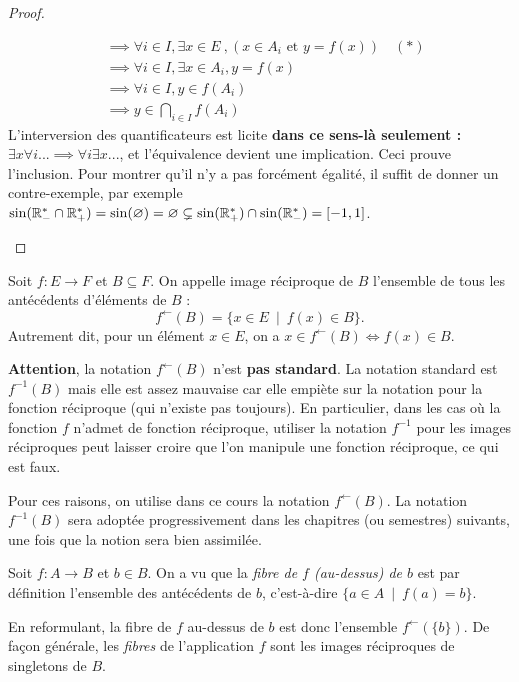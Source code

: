 \begin{proof}
\begin{enumerate}
\begin{align*}
&\boxed{\implies \forall i\in I, \exists x\in E}\:, (x\in A_i\text{ et } y=f(x)) \quad(*)\\
&\implies \forall i\in I, \exists x\in A_i, y=f(x)\\
&\implies \forall i\in I, y\in f(A_i)\\
&\implies y\in \bigcap_{i\in I} f(A_i)
\end{align*}
L'interversion des quantificateurs  est licite \textbf{dans ce sens-là seulement : $\exists x \forall i ... \implies \forall i \exists x ...$}, et l'équivalence devient une implication. Ceci prouve l'inclusion. Pour montrer qu'il n'y a pas forcément égalité, il suffit de donner un contre-exemple, par exemple $\sin(\mathbb{R}_-^* \cap \mathbb{R}_+^*) = \sin(\varnothing) = \varnothing \subsetneq \sin(\mathbb{R}_+^*) \cap \sin(\mathbb{R}_-^*)=[-1,1]$.
\end{enumerate}
\end{proof}



\begin{definition}
Soit $f : E\to F$ et $B\subseteq F$. On appelle image réciproque de $B$ l'ensemble de tous les antécédents d'éléments de $B$ :
\[f^\leftarrow(B) = \{x\in E\:\mid\: f(x)\in B \}.\]
Autrement dit, pour un élément $x\in E$, on a $x\in f^\leftarrow(B) \iff f(x)\in B$.

\textbf{Attention}, la notation $f^\leftarrow(B)$ n'est \textbf{pas  standard}. La notation standard est $f^{-1}(B)$ mais elle est assez mauvaise car elle empiète sur la notation pour la fonction réciproque (qui n'existe pas toujours). En particulier,  dans les cas où la fonction $f$ n'admet de fonction réciproque, utiliser la notation  $f^{-1}$ pour les images réciproques peut laisser croire que l'on manipule une fonction réciproque, ce qui est faux.

Pour ces raisons, on utilise dans ce cours la notation $f^\leftarrow(B)$. La notation $f^{-1}(B)$ sera adoptée progressivement dans les chapitres (ou semestres) suivants, une fois que la notion sera bien assimilée.
\end{definition}

\begin{exemple}
Soit $f : A\to B$ et $b\in B$. On a vu que la \emph{fibre de $f$ (au-dessus) de $b$} est par définition l'ensemble des antécédents de $b$, c'est-à-dire $\{a\in A \:\mid\: f(a)=b\} $.

En reformulant, la fibre de $f$ au-dessus de $b$ est donc l'ensemble $f^\leftarrow(\{b\})$. De façon générale, les \emph{fibres} de l'application $f$ sont les images réciproques de singletons de $B$.
\end{exemple}

